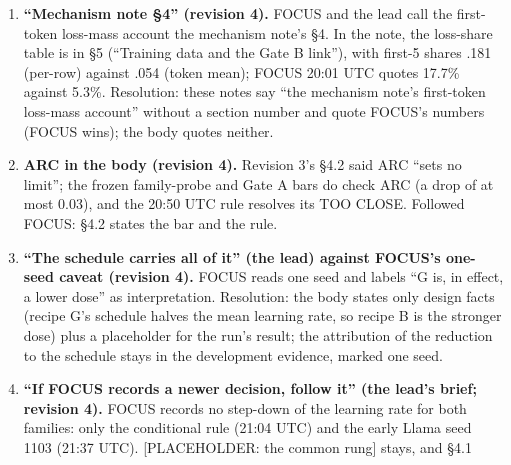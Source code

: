 \documentclass{article}
\theoremstyle{plain}
\theoremstyle{definition}
\theoremstyle{remark}
\begin{document}
\begin{enumerate}
        the results record hold only the interim two-seed reading (1101, 1102);
        seed 1103 is not recorded there. The kit's pair reading for seeds 1101
        and 1103
        (\nolinkurl{tmp/family-probe-olmo2-1b-g-seed1103/reading-olmo-g-1101-1103-nojudge.json})
        shows a two-seed mean of 27.75~pp, which agrees with +26.5; the
        three-seed reading file beside it is empty. Resolution: the number
        appears only in the development evidence; the mean +28.8~pp is marked as
        the drafter's arithmetic. \textbf{RESOLVED (revision 4a):} seed 1103 is
        now recorded in FOCUS (``OLMo under recipe G, all three seeds in'',
        interim) and the results record (commit 8fccce2), so the ``lead's
        figure'' label is dropped.
  \item \textbf{``Mechanism note \S{}4'' (revision 4).} FOCUS and the lead call
        the first-token loss-mass account the mechanism note's \S{}4. In the
        note, the loss-share table is in \S{}5 (``Training data and the Gate B
        link''), with first-5 shares .181 (per-row) against .054 (token mean);
        FOCUS 20:01 UTC quotes 17.7\% against 5.3\%. Resolution: these notes say
        ``the mechanism note's first-token loss-mass account'' without a section
        number and quote FOCUS's numbers (FOCUS wins); the body quotes neither.
  \item \textbf{ARC in the body (revision 4).} Revision 3's \S{}4.2 said ARC
        ``sets no limit''; the frozen family-probe and Gate A bars do check ARC
        (a drop of at most 0.03), and the 20:50 UTC rule resolves its TOO CLOSE.
        Followed FOCUS: \S{}4.2 states the bar and the rule.
  \item \textbf{``The schedule carries all of it'' (the lead) against FOCUS's
        one-seed caveat (revision 4).} FOCUS reads one seed and labels ``G is,
        in effect, a lower dose'' as interpretation. Resolution: the body states
        only design facts (recipe G's schedule halves the mean learning rate, so
        recipe B is the stronger dose) plus a placeholder for the run's result;
        the attribution of the reduction to the schedule stays in the
        development evidence, marked one seed.
  \item \textbf{``If FOCUS records a newer decision, follow it'' (the lead's
        brief; revision 4).} FOCUS records no step-down of the learning rate for
        both families: only the conditional rule (21:04 UTC) and the early Llama
        seed 1103 (21:37 UTC). [PLACEHOLDER: the common rung] stays, and \S{}4.1

\end{enumerate}
\end{document}
